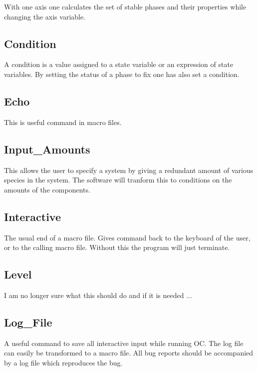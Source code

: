 \documentclass[12pt]{article}
\begin{document}
With one axis one calculates the set of stable phases and their
properties while changing the axis variable.

\subsection{Condition}

A condition is a value assigned to a state variable or an expression
of state variables.  By setting the status of a phase to fix one has
also set a condition.

\subsection{Echo}

This is useful command in macro files.

\subsection{Input\_Amounts}

This allows the user to specify a system by giving a redundant amount
of various species in the system.  The software will tranform this to
conditions on the amounts of the components.

\subsection{Interactive}

The usual end of a macro file.  Gives command back to the keyboard of
the user, or to the calling macro file.  Without this the program will
just terminate.

\subsection{Level}

I am no longer sure what this should do and if it is needed ...

\subsection{Log\_File}

A useful command to save all interactive input while running OC.  The
log file can easily be transformed to a macro file.  All bug reports
should be accompanied by a log file which reproduces the bug.
\end{document}
